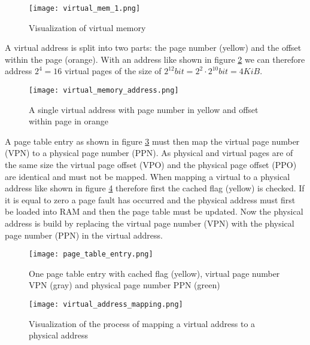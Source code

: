 \begin{figure}[h]
    \centering
    \texttt{[image: virtual\_mem\_1.png]}
    \caption{Visualization of virtual memory}
    \label{fig:virtual_memory}
\end{figure}

A virtual address is split into two parts: the page number (yellow) and the offset within the page (orange). With an address like shown in figure \ref{fig:virtual_memory_address} we can therefore address $2^{4} = 16$ virtual pages of the size of $2^{12} bit= 2^{2} \cdot 2^{10} bit = 4 KiB$.

        \begin{figure}[h]
            \centering
            \texttt{[image: virtual\_memory\_address.png]}
            \caption{A single virtual address with page number in yellow and offset within page in orange}
            \label{fig:virtual_memory_address}
        \end{figure}

        A page table entry as shown in figure \ref{fig:page_table_entry} must then map the virtual page number (VPN) to a physical page number (PPN). As physical and virtual pages are of the same size the virtual page offset (VPO) and the physical page offset (PPO) are identical and must not be mapped. When mapping a virtual to a physical address like shown in figure \ref{fig:virtual_address_mapping} therefore first the cached flag (yellow) is checked. If it is equal to zero a page fault has occurred and the physical address must first be loaded into RAM and then the page table must be updated. Now the physical address is build by replacing the virtual page number (VPN) with the physical page number (PPN) in the virtual address.

        \begin{figure}[h]
            \centering
            \texttt{[image: page\_table\_entry.png]}
            \caption{One page table entry with cached flag (yellow), virtual page number VPN (gray) and physical page number PPN (green)}
            \label{fig:page_table_entry}
        \end{figure}

        \begin{figure}[h]
            \centering
            \texttt{[image: virtual\_address\_mapping.png]}
            \caption{Visualization of the process of mapping a virtual address to a physical address}
            \label{fig:virtual_address_mapping}
        \end{figure}


